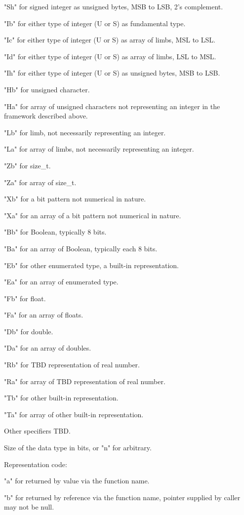 "Sh" for signed integer as unsigned bytes, MSB to LSB, 2's complement.

"Ib" for either type of integer (U or S) as fundamental type.

"Ic" for either type of integer (U or S) as array of limbs, MSL to LSL.

"Id" for either type of integer (U or S) as array of limbs, LSL to MSL.

"Ih" for either type of integer (U or S) as unsigned bytes, MSB to LSB.

"Hb" for unsigned character.

"Ha" for array of unsigned characters not representing an integer in the framework described above.

"Lb" for limb, not necessarily representing an integer.

"La" for array of limbs, not necessarily representing an integer.

"Zb" for size\_t.

"Za" for array of size\_t.

"Xb" for a bit pattern not numerical in nature.

"Xa" for an array of a bit pattern not numerical in nature.

"Bb" for Boolean, typically 8 bits.

"Ba" for an array of Boolean, typically each 8 bits.

"Eb" for other enumerated type, a built-in representation.

"Ea" for an array of enumerated type.

"Fb" for float.

"Fa" for an array of floats.

"Db" for double.

"Da" for an array of doubles.

"Rb" for TBD representation of real number.

"Ra" for array of TBD representation of real number.

"Tb" for other built-in representation.

"Ta" for array of other built-in representation.

Other specifiers TBD.

Size of the data type in bits, or "n" for arbitrary.

Representation code:

"a" for returned by value via the function name.

"b" for returned by reference via the function name, pointer supplied
by caller may not be null.

